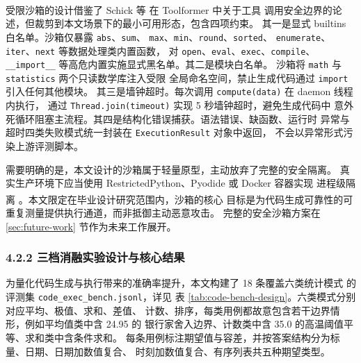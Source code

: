 \documentclass[a4paper]{article}
\theoremstyle{definition}
\theoremstyle{plain}
\theoremstyle{remark}
\newcommand{\reftab}[1]{表 \ref{#1}}
\let\oldcite\cite
\renewcommand{\cite}[1]{\textsuperscript{\oldcite{#1}}}
\newcommand{\bk}{\discretionary{}{}{}}
\begin{document}
受限沙箱的设计借鉴了 Schick 等 \cite{ref21} 在 Toolformer 中关于工具
调用安全边界的论述，但裁剪到本文场景下的最小可用形态，包含四项约束。
其一是显式 builtins 白名单。沙箱仅暴露 \texttt{abs}、\texttt{sum}、
\texttt{max}、\texttt{min}、\texttt{round}、\texttt{sorted}、
\texttt{enumerate}、\texttt{iter}、\texttt{next} 等数据处理类内置函数，
对 \texttt{open}、\texttt{eval}、\texttt{exec}、\texttt{compile}、
\texttt{\_\bk{}\_\bk{}import\_\bk{}\_\bk{}} 等高危内置实施显式黑名单。其二是模块白名单。
沙箱将 \texttt{math} 与 \texttt{statistics} 两个只读数学库注入受限
全局命名空间，禁止生成代码通过 \texttt{import} 引入任何其他模块。
其三是墙钟超时。每次调用 \texttt{compute(data)} 在 daemon 线程内执行，
通过 \texttt{Thread.\bk{}join(timeout)} 实现 5 秒墙钟超时，避免生成代码中
意外死循环阻塞主流程。其四是结构化错误捕获。语法错误、缺函数、运行时
异常与超时四类失败模式统一封装在 \texttt{ExecutionResult} 对象中返回，
不会以异常形式污染上游评测脚本。

需要明确的是，本文设计的沙箱属于轻量原型，主动放弃了完整的安全隔离。
真实生产环境下应当使用 RestrictedPython、Pyodide 或 Docker 容器实现
进程级隔离 \cite{ref23}。本文限定在毕业设计研究范围内，沙箱的核心
目标是为代码生成可靠性的可重复测量提供执行通道，而非抵御主动恶意攻击。
完整的安全沙箱方案在 \ref{sec:future-work} 节作为未来工作展开。

\subsubsection*{4.2.2 \quad 三档消融实验设计与核心结果}

为量化代码生成与执行带来的准确率提升，本文构建了 18 条覆盖六类统计模式
的评测集 \texttt{code\_\bk{}exec\_\bk{}bench.\bk{}jsonl}，详见
\reftab{tab:code-bench-design}。六类模式分别对应平均、极值、求和、差值、
计数、排序，每类用例都故意包含若干边界情形，例如平均值类中含 24.95 的
银行家舍入边界、计数类中含 35.0 的高温阈值平等、求和类中含条件求和。
每条用例标注期望值与容差，并按答案结构分为标量、日期、日期加数值复合、
时刻加数值复合、有序列表共五种期望类型。
\end{document}
